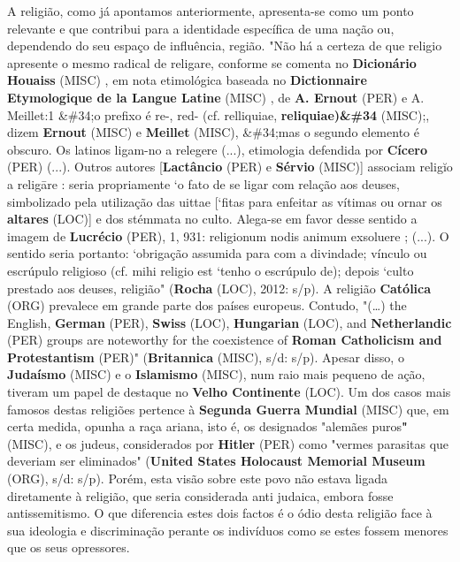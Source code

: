 \documentclass[12pt,a4paper]{article}
\begin{document}
A  religião,  como  já  apontamos  anteriormente,  apresenta-se  como  um  ponto relevante e que contribui para a identidade específica de uma nação ou, dependendo do seu  espaço  de  influência,  região.  "Não  há  a  certeza  de  que  religio  apresente  o  mesmo radical  de  religare,  conforme  se  comenta  no \textbf{Dicionário  Houaiss} (MISC) ,  em  nota  etimológica baseada no \textbf{Dictionnaire Etymologique de la Langue Latine} (MISC) , de \textbf{A. Ernout} (PER) e A. Meillet:1 \&\#34;o prefixo é re-, red- (cf. relliquiae, \textbf{reliquiae)\&\#34} (MISC);, dizem \textbf{Ernout} (MISC) e \textbf{Meillet} (MISC), \&\#34;mas o segundo elemento é obscuro. Os latinos ligam-no a relegere (...), etimologia defendida por \textbf{Cícero} (PER) (...). Outros autores [\textbf{Lactâncio} (PER) e \textbf{Sérvio} (MISC)] associam religĭo a religāre : seria propriamente `o fato de se ligar com relação aos deuses, simbolizado pela utilização das uittae [`fitas para enfeitar as vítimas ou ornar os \textbf{altares} (LOC)] e dos stémmata no culto. Alega-se em favor desse sentido a imagem de \textbf{Lucrécio} (PER), 1, 931: religionum nodis animum exsoluere ; (...). O sentido seria portanto: `obrigação assumida para com a divindade; vínculo ou escrúpulo religioso (cf. mihi religio est `tenho o escrúpulo de); depois `culto prestado aos deuses, religião" (\textbf{Rocha} (LOC), 2012: s/p). A religião \textbf{Católica} (ORG) prevalece em grande parte dos países europeus.  Contudo,  "(…)  the  English,  \textbf{German} (PER),  \textbf{Swiss} (LOC),  \textbf{Hungarian} (LOC),  and  \textbf{Netherlandic} (PER) groups  are  noteworthy  for  the  coexistence  of  \textbf{Roman  Catholicism  and  Protestantism} (PER)" (\textbf{Britannica} (MISC), s/d: s/p). Apesar disso, o \textbf{Judaísmo} (MISC) e o \textbf{Islamismo} (MISC), num raio mais pequeno de ação, tiveram um papel de destaque no \textbf{Velho Continente} (LOC). Um dos casos mais famosos destas religiões pertence à \textbf{Segunda Guerra Mundial} (MISC) que, em certa medida, opunha a raça ariana, isto é, os designados "alemães puros\textbf{"} (MISC), e os judeus, considerados por \textbf{Hitler} (PER) como "vermes  parasitas  que  deveriam  ser  eliminados"  (\textbf{United  States  Holocaust  Memorial Museum} (ORG),  s/d:  s/p).  Porém,  esta  visão  sobre  este  povo  não  estava  ligada  diretamente  à religião,  que  seria  considerada  anti  judaica,  embora  fosse  antissemitismo.  O  que diferencia estes dois factos é o ódio desta religião face à sua ideologia e discriminação perante os indivíduos como se estes fossem menores que os seus opressores.
\end{document}
